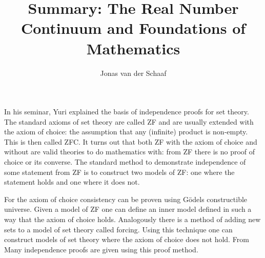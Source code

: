 \documentclass{article}
\title{Summary: The Real Number Continuum and Foundations of Mathematics}
\author{Jonas van der Schaaf}
\date{}
\begin{document}
\maketitle

In his seminar, Yuri explained the basis of independence proofs for set theory.
The standard axioms of set theory are called ZF and are usually extended with
the axiom of choice: the assumption that any (infinite) product is non-empty.
This is then called ZFC. It turns out that both ZF with the axiom of choice and
without are valid theories to do mathematics with: from ZF there is no proof of
choice or its converse. The standard method to demonstrate independence of some
statement from ZF is to construct two models of ZF: one where the statement
holds and one where it does not.

For the axiom of choice consistency can be proven using Gödels constructible
universe. Given a model of ZF one can define an inner model defined in such a
way that the axiom of choice holds. Analogously there is a method of adding new
sets to a model of set theory called forcing. Using this technique one can
construct models of set theory where the axiom of choice does not hold. From
Many independence proofs are given using this proof method.
\end{document}
